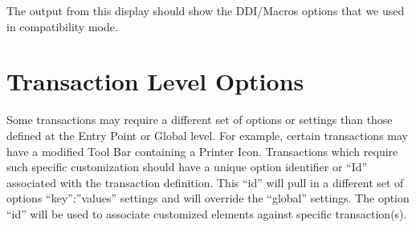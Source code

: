\documentclass[letterpaper,10pt,english]{sphinxmanual}
\begin{document}
The output from this display should show the DDI/Macros options that we used in compatibility mode.

\begin{sphinxVerbatim}[commandchars=\\\{\}]
   
\end{sphinxVerbatim}


\ignorespaces 

\section{Transaction Level Options}
\label{\detokenize{Customization:transaction-level-options}}\label{\detokenize{Customization:index-5}}
Some transactions may require a different set of options or settings than those defined at the Entry Point or Global level. For example, certain transactions may have a modified Tool Bar containing a Printer Icon. Transactions which require such specific customization should have a unique option identifier or “Id” associated with the transaction definition. This “id” will pull in a different set of options “key”:”values” settings and will override the “global” settings. The option “id” will be used to associate customized elements against specific transaction(s).
\end{document}
